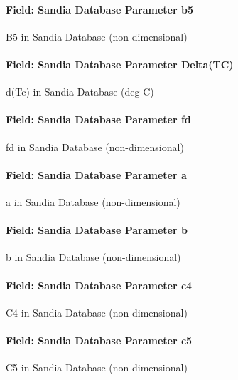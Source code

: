 \paragraph{Field: Sandia Database Parameter b5}\label{field-sandia-database-parameter-b5}

B5 in Sandia Database (non-dimensional)

\paragraph{Field: Sandia Database Parameter Delta(TC)}\label{field-sandia-database-parameter-deltatc}

d(Tc) in Sandia Database (deg C)

\paragraph{Field: Sandia Database Parameter fd}\label{field-sandia-database-parameter-fd}

fd in Sandia Database (non-dimensional)

\paragraph{Field: Sandia Database Parameter a}\label{field-sandia-database-parameter-a}

a in Sandia Database (non-dimensional)

\paragraph{Field: Sandia Database Parameter b}\label{field-sandia-database-parameter-b}

b in Sandia Database (non-dimensional)

\paragraph{Field: Sandia Database Parameter c4}\label{field-sandia-database-parameter-c4}

C4 in Sandia Database (non-dimensional)

\paragraph{Field: Sandia Database Parameter c5}\label{field-sandia-database-parameter-c5}

C5 in Sandia Database (non-dimensional)

